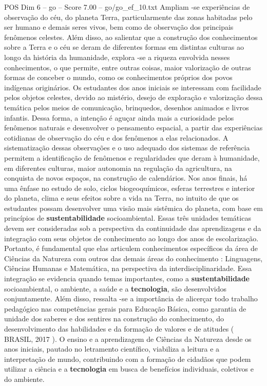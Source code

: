 \begin{textsample}{POS Dim 6 – go – Score 7.00 – go/go\_ef\_10.txt}
Ampliam -se experiências de observação do céu, do planeta Terra, particularmente das zonas habitadas pelo ser humano e demais seres vivos, bem como de observação dos principais fenômenos celestes.
Além disso, ao salientar que a construção dos conhecimentos sobre a Terra e o céu se deram de diferentes formas em distintas culturas ao longo da história da humanidade, explora -se a riqueza envolvida nesses conhecimentos, o que permite, entre outras coisas, maior valorização de outras formas de conceber o mundo, como os conhecimentos próprios dos povos indígenas originários.
Os estudantes dos anos iniciais se interessam com facilidade pelos objetos celestes, devido ao mistério, desejo de exploração e valorização dessa temática pelos meios de comunicação, brinquedos, desenhos animados e livros infantis.
Dessa forma, a intenção é aguçar ainda mais a curiosidade pelos fenômenos naturais e desenvolver o pensamento espacial, a partir das experiências cotidianas de observação do céu e dos fenômenos a elas relacionados.
A sistematização dessas observações e o uso adequado dos sistemas de referência permitem a identificação de fenômenos e regularidades que deram à humanidade, em diferentes culturas, maior autonomia na regulação da agricultura, na conquista de novos espaços, na construção de calendários.
Nos anos finais, há uma ênfase no estudo de solo, ciclos biogeoquímicos, esferas terrestres e interior do planeta, clima e seus efeitos sobre a vida na Terra, no intuito de que os estudantes possam desenvolver uma visão mais sistêmica do planeta, com base em princípios de \textbf{sustentabilidade} socioambiental.
Essas três unidades temáticas devem ser consideradas sob a perspectiva da continuidade das aprendizagens e da integração com seus objetos de conhecimento ao longo dos anos de escolarização.
Portanto, é fundamental que elas articulem conhecimentos específicos da área de Ciências da Natureza com outros das demais áreas do conhecimento : Linguagens, Ciências Humanas e Matemática, na perspectiva da interdisciplinaridade.
Essa integração se evidencia quando temas importantes, como a \textbf{sustentabilidade} socioambiental, o ambiente, a saúde e a \textbf{tecnologia}, são desenvolvidos conjuntamente.
Além disso, ressalta -se a importância de alicerçar todo trabalho pedagógico nas competências gerais para Educação Básica, como garantia de unidade dos saberes e dos sentires na construção do conhecimento, do desenvolvimento das habilidades e da formação de valores e de atitudes ( BRASIL, 2017 ).
O ensino e a aprendizagem de Ciências da Natureza desde os anos iniciais, pautado no letramento científico, viabiliza a leitura e a interpretação de mundo, contribuindo com a formação de cidadãos que podem utilizar a ciência e a \textbf{tecnologia} em busca de benefícios individuais, coletivos e do ambiente.

\end{textsample}
